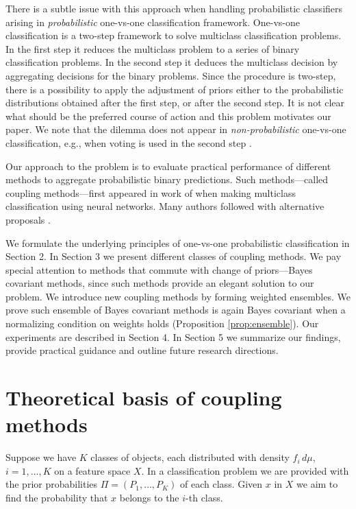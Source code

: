 \documentclass[pdflatex, sn-basic]{sn-jnl}%
\theoremstyle{thmstyleone}%
\theoremstyle{thmstyletwo}%
\theoremstyle{thmstylethree}%
\begin{document}
There is a subtle issue with this approach  when handling probabilistic 
classifiers arising in \emph{probabilistic} one-vs-one classification framework.   
One-vs-one classification is a two-step framework to solve 
multiclass classification problems.
In the first step it reduces the multiclass problem to a series of binary
classification problems. 
In the second step it deduces the multiclass decision by aggregating decisions 
for the binary problems. Since the procedure is two-step, there is a possibility 
to apply the adjustment of priors either to the probabilistic distributions 
obtained after the first step, or after the second step. It is not clear what 
should be the preferred course of action and this problem motivates our paper. We note that the dilemma does not appear
in \emph{non-probabilistic} one-vs-one classification, e.g., when voting is used in the second step \cite{galar2011overview}.


Our approach to the problem is to evaluate practical performance of different 
methods to aggregate probabilistic binary predictions. Such methods---called coupling methods---first appeared in work of \cite{refregier1991probabilistic} when making 
multiclass classification using neural networks. 
Many authors followed with alternative proposals 
\cite{price1994pairwise, hastie1998classification,  zahorian1999partitioned,
wu2004probability, vsuch2015new, vsuch2016bayes}.

We formulate the underlying principles of one-vs-one probabilistic classification in Section 2. In Section 3 we present  different classes of coupling methods. 
We pay special attention to methods that commute with change of priors---Bayes covariant methods, 
since such methods provide an  elegant solution to our problem. 
We introduce new coupling methods by forming weighted ensembles. We prove such ensemble of Bayes covariant methods is again Bayes covariant
when a normalizing condition on weights holds (Proposition \ref{prop:ensemble}).  
Our experiments are described in Section 4. In Section 5 we summarize our findings, 
provide practical guidance and outline future research directions.

\section{Theoretical basis of coupling methods} \label{sec:theory}

Suppose we have $K$ classes of objects, each distributed with density $f_i\, d\mu$, $i=1,\ldots, K$ on a feature 
space $X$. In a  classification problem we are provided with 
the prior probabilities $\Pi = (P_1, \ldots, P_K)$ of each class. Given $x$ in $X$ we aim to find 
the probability that $x$ belongs to the $i$-th class. 
\end{document}
